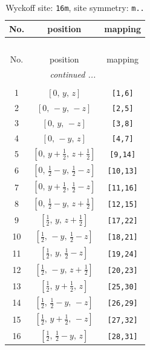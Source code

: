 \documentclass[fleqn,8pt]{jsarticle}
\begin{document}
\renewcommand{\arraystretch}{1.2}
\begin{longtable}{ccc}
\caption{Wyckoff site: {\tt 16m}, site symmetry: {\tt m..}}
 \\
 \hline \hline
No. & position & mapping \\ \hline \endfirsthead

\multicolumn{2}{l}{\tablename\ \thetable{}} \\
 \hline \hline
No. & position & mapping \\ \hline \endhead

 \hline \hline
\multicolumn{2}{r}{\footnotesize\it continued ...} \\ \endfoot

 \hline \hline
\multicolumn{2}{r}{} \\ \endlastfoot

1 & $\left[ 0,\, y,\, z \right]$ & {\tt [1,6]} \\ \hline
2 & $\left[ 0,\, - y,\, - z \right]$ & {\tt [2,5]} \\ \hline
3 & $\left[ 0,\, y,\, - z \right]$ & {\tt [3,8]} \\ \hline
4 & $\left[ 0,\, - y,\, z \right]$ & {\tt [4,7]} \\ \hline
5 & $\left[ 0,\, y + \frac{1}{2},\, z + \frac{1}{2} \right]$ & {\tt [9,14]} \\ \hline
6 & $\left[ 0,\, \frac{1}{2} - y,\, \frac{1}{2} - z \right]$ & {\tt [10,13]} \\ \hline
7 & $\left[ 0,\, y + \frac{1}{2},\, \frac{1}{2} - z \right]$ & {\tt [11,16]} \\ \hline
8 & $\left[ 0,\, \frac{1}{2} - y,\, z + \frac{1}{2} \right]$ & {\tt [12,15]} \\ \hline
9 & $\left[ \frac{1}{2},\, y,\, z + \frac{1}{2} \right]$ & {\tt [17,22]} \\ \hline
10 & $\left[ \frac{1}{2},\, - y,\, \frac{1}{2} - z \right]$ & {\tt [18,21]} \\ \hline
11 & $\left[ \frac{1}{2},\, y,\, \frac{1}{2} - z \right]$ & {\tt [19,24]} \\ \hline
12 & $\left[ \frac{1}{2},\, - y,\, z + \frac{1}{2} \right]$ & {\tt [20,23]} \\ \hline
13 & $\left[ \frac{1}{2},\, y + \frac{1}{2},\, z \right]$ & {\tt [25,30]} \\ \hline
14 & $\left[ \frac{1}{2},\, \frac{1}{2} - y,\, - z \right]$ & {\tt [26,29]} \\ \hline
15 & $\left[ \frac{1}{2},\, y + \frac{1}{2},\, - z \right]$ & {\tt [27,32]} \\ \hline
16 & $\left[ \frac{1}{2},\, \frac{1}{2} - y,\, z \right]$ & {\tt [28,31]} \\
\end{longtable}
\end{document}
